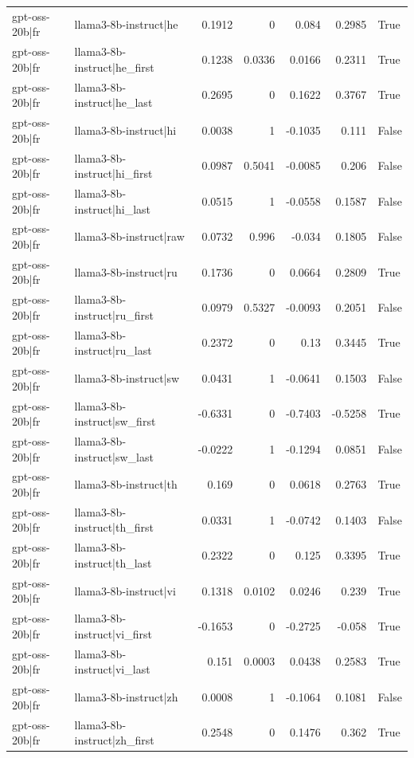 \begin{table}
\begin{tabular}{l l r r r r l}
gpt-oss-20b|fr & llama3-8b-instruct|he & 0.1912 & 0 & 0.084 & 0.2985 & True \\
gpt-oss-20b|fr & llama3-8b-instruct|he_first & 0.1238 & 0.0336 & 0.0166 & 0.2311 & True \\
gpt-oss-20b|fr & llama3-8b-instruct|he_last & 0.2695 & 0 & 0.1622 & 0.3767 & True \\
gpt-oss-20b|fr & llama3-8b-instruct|hi & 0.0038 & 1 & -0.1035 & 0.111 & False \\
gpt-oss-20b|fr & llama3-8b-instruct|hi_first & 0.0987 & 0.5041 & -0.0085 & 0.206 & False \\
gpt-oss-20b|fr & llama3-8b-instruct|hi_last & 0.0515 & 1 & -0.0558 & 0.1587 & False \\
gpt-oss-20b|fr & llama3-8b-instruct|raw & 0.0732 & 0.996 & -0.034 & 0.1805 & False \\
gpt-oss-20b|fr & llama3-8b-instruct|ru & 0.1736 & 0 & 0.0664 & 0.2809 & True \\
gpt-oss-20b|fr & llama3-8b-instruct|ru_first & 0.0979 & 0.5327 & -0.0093 & 0.2051 & False \\
gpt-oss-20b|fr & llama3-8b-instruct|ru_last & 0.2372 & 0 & 0.13 & 0.3445 & True \\
gpt-oss-20b|fr & llama3-8b-instruct|sw & 0.0431 & 1 & -0.0641 & 0.1503 & False \\
gpt-oss-20b|fr & llama3-8b-instruct|sw_first & -0.6331 & 0 & -0.7403 & -0.5258 & True \\
gpt-oss-20b|fr & llama3-8b-instruct|sw_last & -0.0222 & 1 & -0.1294 & 0.0851 & False \\
gpt-oss-20b|fr & llama3-8b-instruct|th & 0.169 & 0 & 0.0618 & 0.2763 & True \\
gpt-oss-20b|fr & llama3-8b-instruct|th_first & 0.0331 & 1 & -0.0742 & 0.1403 & False \\
gpt-oss-20b|fr & llama3-8b-instruct|th_last & 0.2322 & 0 & 0.125 & 0.3395 & True \\
gpt-oss-20b|fr & llama3-8b-instruct|vi & 0.1318 & 0.0102 & 0.0246 & 0.239 & True \\
gpt-oss-20b|fr & llama3-8b-instruct|vi_first & -0.1653 & 0 & -0.2725 & -0.058 & True \\
gpt-oss-20b|fr & llama3-8b-instruct|vi_last & 0.151 & 0.0003 & 0.0438 & 0.2583 & True \\
gpt-oss-20b|fr & llama3-8b-instruct|zh & 0.0008 & 1 & -0.1064 & 0.1081 & False \\
gpt-oss-20b|fr & llama3-8b-instruct|zh_first & 0.2548 & 0 & 0.1476 & 0.362 & True \\

\end{tabular}
\end{table}
